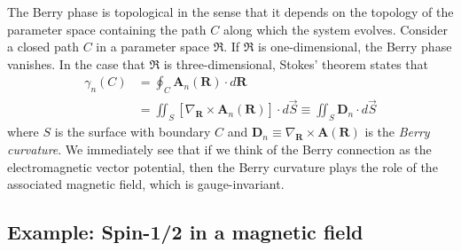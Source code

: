 \documentclass[reprint,
nofootinbib,
amsmath,amssymb,
aps]{revtex4-1}
\newcommand{\lb}{\left[}
\newcommand{\rb}{\right]}
\begin{document}
The Berry phase is topological in the sense that it depends on the topology of the parameter space containing the path $C$ along which the system evolves. Consider a closed path $C$ in a parameter space $\mathfrak{R}$. If $\mathfrak{R}$ is one-dimensional, the Berry phase vanishes. In the case that $\mathfrak{R}$ is three-dimensional, Stokes' theorem states that 
\begin{align*}
\gamma_n(C) &=  \oint_C \bm{A}_n(\bm{R}) \cdot d{\bm{R}} \\
&= \iint_{S} \lb  \nabla_{\bm{R}} \times \bm{A}_n(\bm{R}) \rb  \cdot d\vec{S} \equiv \iint_S \bm{D}_n \cdot d\vec{S}
\end{align*}
where $S$ is the surface with boundary $C$ and $\bm{D}_n \equiv \nabla_{\bm{R}} \times \bm{A}(\bm{R}) $ is the \textit{Berry curvature}. We immediately see that if we think of the Berry connection as the electromagnetic vector potential, then the Berry curvature plays the role of the associated magnetic field, which is gauge-invariant. 



\subsection{Example: Spin-1/2 in a magnetic field}
\end{document}
